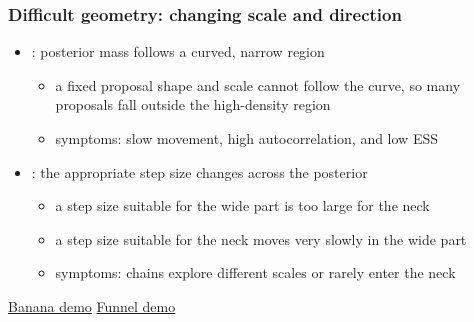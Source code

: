 \documentclass[10pt]{beamer}
\begin{document}
\begin{frame}

\frametitle{Difficult geometry: changing scale and direction}

  \begin{itemize}
  \item {}: posterior mass follows a curved,
    narrow region
    \begin{itemize}
    \item a fixed proposal shape and scale cannot follow the curve, so
      many proposals fall outside the high-density region
    \item symptoms: slow movement, high autocorrelation, and low ESS
    \end{itemize}
  \pause
  \item {}: the appropriate step size changes across
    the posterior
    \begin{itemize}
    \item a step size suitable for the wide part is too large for the neck
    \item a step size suitable for the neck moves very slowly in the wide part
    \item symptoms: chains explore different scales or rarely enter the neck
    \end{itemize}
  \end{itemize}

  \vfill
  \centering
  \href{https://chi-feng.github.io/mcmc-demo/app.html?algorithm=RandomWalkMH&target=banana}{Banana demo}
  \qquad
  \href{https://chi-feng.github.io/mcmc-demo/app.html?algorithm=RandomWalkMH&target=funnel}{Funnel demo}

\end{frame}
\end{document}
